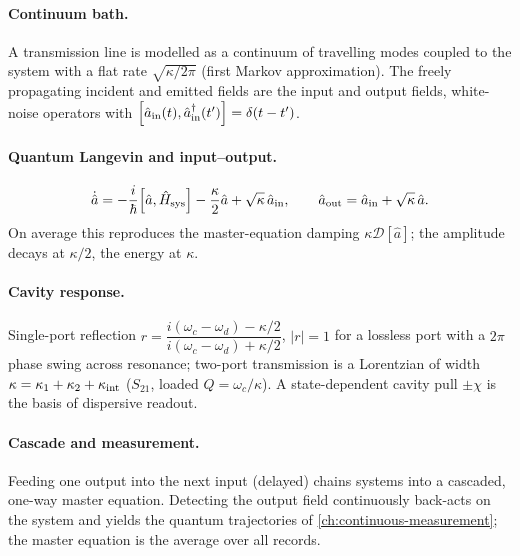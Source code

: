 \clearpage
\begin{chaptersummary}

\paragraph{Continuum bath.}
A transmission line is modelled as a continuum of travelling modes
coupled to the system with a flat rate $\sqrt{\kappa/2\pi}$ (first
Markov approximation). The freely propagating incident and emitted
fields are the input and output fields, white-noise operators with
$\comm{\hat a_{\rm in}(t)}{\hat a_{\rm in}^\dagger(t')}=\delta(t-t')$.

\paragraph{Quantum Langevin and input--output.}
\begin{equation}
\dot{\hat a} = -\frac{i}{\hbar}\comm{\hat a}{\op H_{\rm sys}}
- \frac{\kappa}{2}\hat a + \sqrt{\kappa}\,\hat a_{\rm in},
\qquad
\hat a_{\rm out} = \hat a_{\rm in} + \sqrt{\kappa}\,\hat a.
\end{equation}
On average this reproduces the master-equation damping
$\kappa\mathcal D[\hat a]$; the amplitude decays at $\kappa/2$, the
energy at $\kappa$.

\paragraph{Cavity response.}
Single-port reflection
$r=\dfrac{i(\omega_c-\omega_d)-\kappa/2}{i(\omega_c-\omega_d)+\kappa/2}$,
$|r|=1$ for a lossless port with a $2\pi$ phase swing across
resonance; two-port transmission is a Lorentzian of width
$\kappa=\kappa_1+\kappa_2+\kappa_{\rm int}$ ($S_{21}$, loaded
$Q=\omega_c/\kappa$). A state-dependent cavity pull $\pm\chi$ is the
basis of dispersive readout.

\paragraph{Cascade and measurement.}
Feeding one output into the next input (delayed) chains systems
into a cascaded, one-way master equation. Detecting the output
field continuously back-acts on the system and yields the quantum
trajectories of \cref{ch:continuous-measurement}; the master
equation is the average over all records.

\end{chaptersummary}

